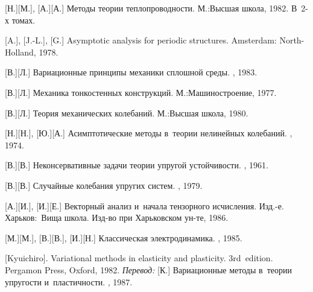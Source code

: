 \begin{thebibliography}{123}
\begin{otherlanguage}{russian}
[Н.][М.], [А.][А.] Методы теории теплопроводности. М.:\;Высшая школа, 1982. В~2\hbox{-}х томах.

[A.], [J.-L.], [G.] Asymptotic analysis for periodic structures. Amsterdam: North\hbox{-}Holland, 1978. 

[В.][Л.] Вариационные принципы механики сплошной среды. \naukapublisher, 1983. 

[В.][Л.] Механика тонкостенных конструкций. М.:\;Машино\-строение, 1977. 

[В.][Л.] Теория механических колебаний. М.:\;Высшая школа, 1980. 

[Н.][Н.], [Ю.][А.] Асимптотические методы в~теории нелинейных колебаний. \naukapublisher, 1974. 

[В.][В.] Неконсервативные задачи теории упругой устойчивости. \fizmatgiz, 1961. 

[В.][В.] Случайные колебания упругих систем. \naukapublisher, 1979. 

[А.][И.], [И.][Е.] Векторный анализ и~начала тензорного исчисления. Изд.\hbox{-}е. Харьков:~Вища школа. Изд\hbox{-}во при Харь\-ков\-ском ун\hbox{-}те, 1986. 

[М.][М.], [В.][В.], [И.][Н.] Классическая электродинамика. \naukapublisher, 1985. 

[Kyuichiro]. Variational methods in elasticity and plasticity. 3rd~edition. Pergamon Press, Oxford, 1982. 
\emph{Перевод:} [К.] Вариационные методы в~теории упругости и~пластичности. \mirpublisher, 1987. 


\end{otherlanguage}
\end{thebibliography}
